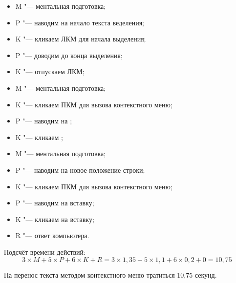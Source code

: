\documentclass{bsuir}
\begin{document}
\begin{itemize}
	\item M "--- ментальная подготовка;
	\item P "--- наводим на начало текста веделения;
	\item K "--- кликаем ЛКМ для начала выделения;
	\item P "--- доводим до конца выделения;
	\item K "--- отпускаем ЛКМ;
	\item M "--- ментальная подготовка;
	\item K "--- кликаем ПКМ для вызова контекстного меню;
	\item P "--- наводим на ;
	\item K "--- кликаем ;
	\item M "--- ментальная подготовка;
	\item P "--- наводим на новое положение строки;
	\item K "--- кликаем ПКМ для вызова контекстного меню;
	\item P "--- наводим на вставку;
	\item K "--- кликаем на вставку;
	\item R "--- ответ компьютера.
\end{itemize}

Подсчёт времени действий: \[
	3\times M + 5\times P + 6\times K + R =
	3\times 1,35 + 5\times 1,1 + 6\times 0,2 + 0 = 10,75
\]

На перенос текста методом контекстного меню тратиться 10,75 секунд.
\end{document}
